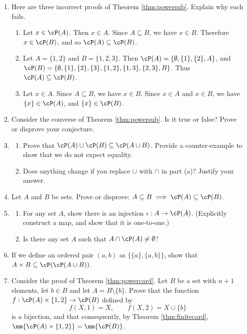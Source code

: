 \begin{enumerate}
	\item\label{ex:powersub1} Here are three incorrect proofs of Theorem \ref{thm:powersub}. Explain why each fails.
	\begin{enumerate}
		\item Let $x\in\cP(A)$. Then $x\in A$. Since $A\subseteq B$, we have $x\in B$. Therefore $x\in\cP(B)$, and so $\cP(A)\subseteq\cP(B)$.
		\item Let $A=\{1,2\}$ and $B=\{1,2,3\}$. Then $\cP(A)=\{\emptyset,\{1\},\{2\},A\}$, and\\
		$\cP(B)=\{\emptyset,\{1\},\{2\},\{3\},\{1,2\},\{1,3\},\{2,3\},B\}$. Thus $\cP(A)\subseteq\cP(B)$.
		\item Let $x\in A$. Since $A\subseteq B$, we have $x\in B$. Since $x\in A$ and $x\in B$, we have $\{x\}\in\cP(A)$, and $\{x\}\in\cP(B)$.
	\end{enumerate}
	
	\item\label{ex:powersub2} Consider the converse of Theorem \ref{thm:powersub}. Is it true or false? Prove or disprove your conjecture.
	
	\item\begin{enumerate}
	  \item Prove that $\cP(A)\cup\cP(B)\subseteq\cP(A\cup B)$. Provide a counter-example to show that we do not expect equality.
	  \item Does anything change if you replace $\cup$ with $\cap$ in part (a)? Justify your answer.
	\end{enumerate}

 \item Let $A$ and $B$ be sets. Prove or disprove: $A \subseteq B \implies \cP(A) \subseteq \cP(B)$.

 
	\item \begin{enumerate} \item For any set $A$, show there is an injection $\iota : A \to \cP(A)$. (Explicitly construct a map, and show that it is one-to-one.)
\item Is there any set $A$ such that $A \cap \cP(A) \neq \emptyset$?
\end{enumerate}

\item If we define an ordered pair $(a,b)$ as $\{\{a\}, \{a,b\}\}$, show that $A \times B \subseteq \cP(\cP(A \cup B))$.
	
	\item Consider the proof of Theorem \ref{thm:powercard}. Let $B$ be a set with $n+1$ elements, let $b\in B$ and let $A=B\setminus\{b\}$. Prove that the function $f:\cP(A)\times\{1,2\}\to\cP(B)$ defined by
	\[f(X,1)=X,\qquad f(X,2)=X\cup\{b\}\]
	is a bijection, and that consequently, by Theorem \ref{thm:finitecard}, $\nm{\cP(A)\times\{1,2\}}=\nm{\cP(B)}$.
	

\end{enumerate}
